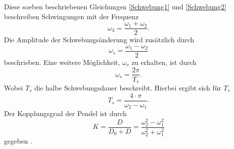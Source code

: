 Diese soeben beschriebenen Gleichungen \ref{Schwebung1} und \ref{Schwebung2} beschreiben Schwingungen mit der Frequenz
\begin{equation}
    \omega_3 = \frac{\omega_1 + \omega_2}{2}.
    \label{omega3}
\end{equation}
Die Amplitude der Schwebungsänderung wird zusätzlich durch
\begin{equation}
    \omega_s = \frac{\omega_1 - \omega_2}{2}
    \label{omega:s}
\end{equation}
beschrieben. Eine weitere Möglichkeit, $\omega_s$ zu erhalten, ist durch
\begin{equation}
    \omega_s = \frac{2\pi}{T_s}.
\end{equation}
Wobei $T_s$ die halbe Schwebungsdauer beschreibt. Hierbei ergibt sich für $T_s$
\begin{equation}
    T_s = \frac{4 \cdot \pi}{\omega_2 - \omega_1}.
\end{equation}
Der Kopplungsgrad der Pendel ist durch
\begin{equation}
    K = \frac{D}{D_0 + D} = \frac{\omega_2^2 - \omega_1^2}{\omega_2^2 + \omega_1^2}
    \label{Kopplungsg}
\end{equation}
gegeben \cite{M5}.
